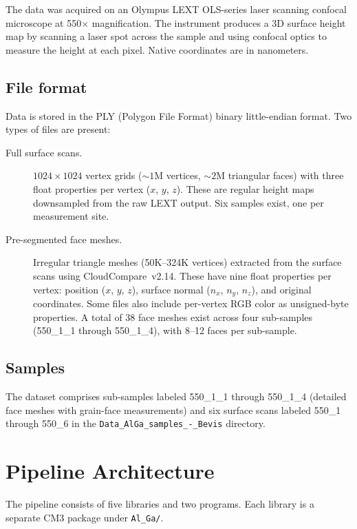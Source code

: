 \documentclass[11pt]{article}
\begin{document}
The data was acquired on an Olympus LEXT OLS-series laser scanning
confocal microscope at 550$\times$ magnification.  The instrument
produces a 3D surface height map by scanning a laser spot across the
sample and using confocal optics to measure the height at each pixel.
Native coordinates are in nanometers.

\subsection{File format}

Data is stored in the PLY (Polygon File Format) binary
little-endian format.  Two types of files are present:

\begin{description}
\item[Full surface scans.]
  $1024 \times 1024$ vertex grids (${\sim}1$M vertices, ${\sim}2$M
  triangular faces) with three float properties per vertex ($x$, $y$,
  $z$).  These are regular height maps downsampled from the raw LEXT
  output.  Six samples exist, one per measurement site.

\item[Pre-segmented face meshes.]
  Irregular triangle meshes (50K--324K vertices) extracted from the
  surface scans using CloudCompare~v2.14.  These have nine float
  properties per vertex: position ($x$, $y$, $z$), surface normal
  ($n_x$, $n_y$, $n_z$), and original coordinates.  Some files also
  include per-vertex RGB color as unsigned-byte properties.  A total
  of 38 face meshes exist across four sub-samples (550\_1\_1 through
  550\_1\_4), with 8--12 faces per sub-sample.
\end{description}

\subsection{Samples}

The dataset comprises sub-samples labeled 550\_1\_1 through 550\_1\_4
(detailed face meshes with grain-face measurements) and six surface
scans labeled 550\_1 through 550\_6 in the
\texttt{Data\_AlGa\_samples\_-\_Bevis} directory.

\section{Pipeline Architecture}

The pipeline consists of five libraries and two programs.  Each
library is a separate CM3 package under \texttt{Al\_Ga/}.
\end{document}
